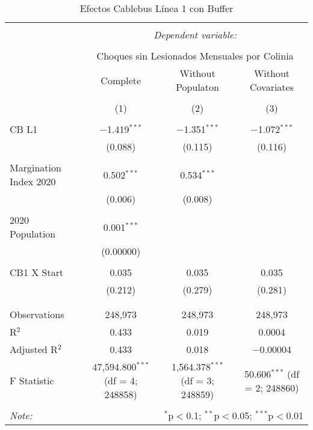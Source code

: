 
\begin{table}[!htbp] \centering 
  \caption{Efectos Cablebus Línea 1 con Buffer} 
  \label{} 
\begin{tabular}{@{\extracolsep{5pt}}lccc} 
\\[-1.8ex]\hline 
\hline \\[-1.8ex] 
 & \multicolumn{3}{c}{\textit{Dependent variable:}} \\ 
\cline{2-4} 
\\[-1.8ex] & \multicolumn{3}{c}{Choques sin Lesionados Mensuales por Colinia} \\ 
 & Complete & Without Populaton & Without Covariates \\ 
\\[-1.8ex] & (1) & (2) & (3)\\ 
\hline \\[-1.8ex] 
 CB L1 & $-$1.419$^{***}$ & $-$1.351$^{***}$ & $-$1.072$^{***}$ \\ 
  & (0.088) & (0.115) & (0.116) \\ 
  & & & \\ 
 Margination Index 2020 & 0.502$^{***}$ & 0.534$^{***}$ &  \\ 
  & (0.006) & (0.008) &  \\ 
  & & & \\ 
 2020 Population & 0.001$^{***}$ &  &  \\ 
  & (0.00000) &  &  \\ 
  & & & \\ 
 CB1 X Start & 0.035 & 0.035 & 0.035 \\ 
  & (0.212) & (0.279) & (0.281) \\ 
  & & & \\ 
\hline \\[-1.8ex] 
Observations & 248,973 & 248,973 & 248,973 \\ 
R$^{2}$ & 0.433 & 0.019 & 0.0004 \\ 
Adjusted R$^{2}$ & 0.433 & 0.018 & $-$0.00004 \\ 
F Statistic & 47,594.800$^{***}$ (df = 4; 248858) & 1,564.378$^{***}$ (df = 3; 248859) & 50.606$^{***}$ (df = 2; 248860) \\ 
\hline 
\hline \\[-1.8ex] 
\textit{Note:}  & \multicolumn{3}{r}{$^{*}$p$<$0.1; $^{**}$p$<$0.05; $^{***}$p$<$0.01} \\ 
\end{tabular} 
\end{table} 
